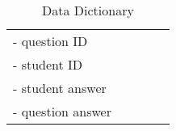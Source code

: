\begin{table}[H]
{\begin{tabular}{ | l | l | l |l| p{5cm} |}
	   - question ID   		 &  				&    	&\\ 
	   - student ID		  	 &  		   		&  	 	&\\
	   - student answer	  	 &  		    	&   	&\\	   
	   - question answer  	 &               	&  		&\\ \hline 
								
    \hline
   
    \end{tabular}
    }
    
 \caption{Data Dictionary}
\end{table}

    

    



